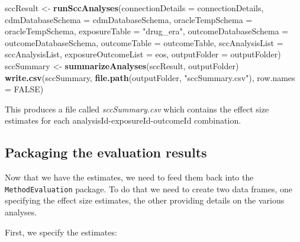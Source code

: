 \documentclass[]{article}
\newenvironment{Shaded}{\begin{snugshade}}{\end{snugshade}}
\newcommand{\DataTypeTok}[1]{\textcolor[rgb]{0.13,0.29,0.53}{#1}}
\newcommand{\KeywordTok}[1]{\textcolor[rgb]{0.13,0.29,0.53}{\textbf{#1}}}
\newcommand{\NormalTok}[1]{#1}
\newcommand{\OtherTok}[1]{\textcolor[rgb]{0.56,0.35,0.01}{#1}}
\newcommand{\StringTok}[1]{\textcolor[rgb]{0.31,0.60,0.02}{#1}}
\begin{document}
\begin{Shaded}
\begin{Highlighting}[]
\NormalTok{sccResult <-}\StringTok{ }\KeywordTok{runSccAnalyses}\NormalTok{(}\DataTypeTok{connectionDetails =}\NormalTok{ connectionDetails,}
                            \DataTypeTok{cdmDatabaseSchema =}\NormalTok{ cdmDatabaseSchema,}
                            \DataTypeTok{oracleTempSchema =}\NormalTok{ oracleTempSchema,}
                            \DataTypeTok{exposureTable =} \StringTok{"drug_era"}\NormalTok{,}
                            \DataTypeTok{outcomeDatabaseSchema =}\NormalTok{ outcomeDatabaseSchema,}
                            \DataTypeTok{outcomeTable =}\NormalTok{ outcomeTable,}
                            \DataTypeTok{sccAnalysisList =}\NormalTok{ sccAnalysisList,}
                            \DataTypeTok{exposureOutcomeList =}\NormalTok{ eos,}
                            \DataTypeTok{outputFolder =}\NormalTok{ outputFolder)}
\NormalTok{sccSummary <-}\StringTok{ }\KeywordTok{summarizeAnalyses}\NormalTok{(sccResult, outputFolder)}
\KeywordTok{write.csv}\NormalTok{(sccSummary, }\KeywordTok{file.path}\NormalTok{(outputFolder, }\StringTok{"sccSummary.csv"}\NormalTok{), }\DataTypeTok{row.names =} \OtherTok{FALSE}\NormalTok{)}
\end{Highlighting}
\end{Shaded}

This produces a file called \emph{sccSummary.csv} which contains the
effect size estimates for each analysisId-exposureId-outcomeId
combination.

\hypertarget{packaging-the-evaluation-results}{%
\subsection{Packaging the evaluation
results}\label{packaging-the-evaluation-results}}

Now that we have the estimates, we need to feed them back into the
\texttt{MethodEvaluation} package. To do that we need to create two data
frames, one specifying the effect size estimates, the other providing
details on the various analyses.

First, we specify the estimates:
\end{document}
